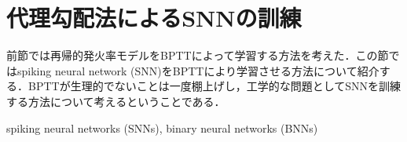 \section{代理勾配法によるSNNの訓練}

前節では再帰的発火率モデルをBPTTによって学習する方法を考えた．この節ではspiking neural network (SNN)をBPTTにより学習させる方法について紹介する．BPTTが生理的でないことは一度棚上げし，工学的な問題としてSNNを訓練する方法について考えるということである．

spiking neural networks (SNNs), binary neural networks (BNNs)

